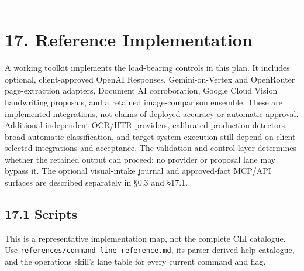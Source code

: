 \documentclass[
]{article}
\begin{document}
\begin{center}\rule{0.5\linewidth}{0.5pt}\end{center}

\section{17. Reference Implementation}\label{reference-implementation}

A working toolkit implements the load-bearing controls in this plan. It
includes optional, client-approved OpenAI Responses, Gemini-on-Vertex
and OpenRouter page-extraction adapters, Document AI corroboration,
Google Cloud Vision handwriting proposals, and a retained
image-comparison ensemble. These are implemented integrations, not
claims of deployed accuracy or automatic approval. Additional
independent OCR/HTR providers, calibrated production detectors, broad
automatic classification, and target-system execution still depend on
client-selected integrations and acceptance. The validation and control
layer determines whether the retained output can proceed; no provider or
proposal lane may bypass it. The optional visual-intake journal and
approved-fact MCP/API surfaces are described separately in §0.3 and
§17.1.

\subsection{17.1 Scripts}\label{scripts}

This is a representative implementation map, not the complete CLI
catalogue. Use
\texttt{references/\allowbreak{}command-\allowbreak{}line-\allowbreak{}reference.md},
its parser-derived help catalogue, and the operations skill's lane table
for every current command and flag.
\end{document}
